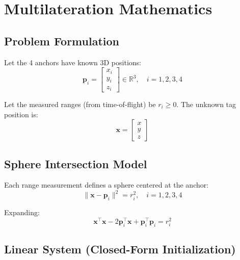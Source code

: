 \documentclass[11pt,a4paper]{article}
\begin{document}
\section{Multilateration Mathematics}

\subsection{Problem Formulation}

Let the 4 anchors have known 3D positions:
\begin{equation}
    \mathbf{p}_i = \begin{bmatrix} x_i \\ y_i \\ z_i \end{bmatrix} \in \mathbb{R}^3, \quad i = 1, 2, 3, 4
\end{equation}

Let the measured ranges (from time-of-flight) be $r_i \geq 0$. The unknown tag position is:
\begin{equation}
    \mathbf{x} = \begin{bmatrix} x \\ y \\ z \end{bmatrix}
\end{equation}

\subsection{Sphere Intersection Model}

Each range measurement defines a sphere centered at the anchor:
\begin{equation}
    \|\mathbf{x} - \mathbf{p}_i\|^2 = r_i^2, \quad i = 1, 2, 3, 4
\end{equation}

Expanding:
\begin{equation}
    \mathbf{x}^\top \mathbf{x} - 2\mathbf{p}_i^\top \mathbf{x} + \mathbf{p}_i^\top \mathbf{p}_i = r_i^2
\end{equation}

\subsection{Linear System (Closed-Form Initialization)}
\end{document}
